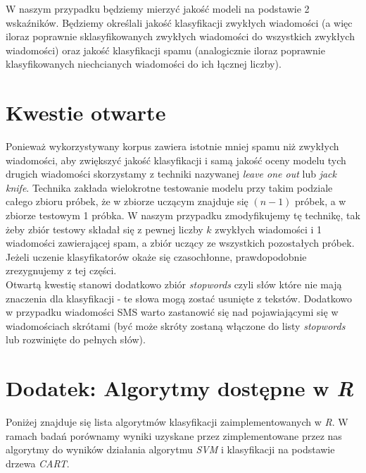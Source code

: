 \documentclass[a4paper,12pt]{article}
\begin{document}
W naszym przypadku będziemy mierzyć jakość modeli na podstawie 2 wskaźników. Będziemy określali jakość klasyfikacji zwykłych wiadomości (a więc iloraz poprawnie sklasyfikowanych zwykłych wiadomości do wszystkich zwykłych wiadomości) oraz jakość klasyfikacji spamu (analogicznie iloraz poprawnie klasyfikowanych niechcianych wiadomości do ich łącznej liczby).\\

\section{Kwestie otwarte}

Ponieważ wykorzystywany korpus zawiera istotnie mniej spamu niż zwykłych wiadomości, aby zwiększyć jakość klasyfikacji i samą jakość oceny modelu tych drugich wiadomości skorzystamy z techniki nazywanej \textit{leave one out} lub \textit{jack knife}. Technika zakłada wielokrotne testowanie modelu przy takim podziale całego
zbioru próbek, że w zbiorze uczącym znajduje się $(n-1)$ próbek, a w zbiorze testowym 1 próbka. W naszym przypadku zmodyfikujemy tę technikę, tak żeby zbiór testowy składał się z pewnej liczby $k$ zwykłych wiadomości i 1 wiadomości zawierającej spam, a zbiór uczący ze wszystkich pozostałych próbek. Jeżeli uczenie klasyfikatorów okaże się czasochłonne, prawdopodobnie zrezygnujemy z tej części.\\

Otwartą kwestię stanowi dodatkowo zbiór \textit{stopwords} czyli słów które nie mają znaczenia dla klasyfikacji - te słowa mogą zostać usunięte z tekstów. Dodatkowo w przypadku wiadomości SMS warto zastanowić się nad pojawiającymi się w wiadomościach skrótami (być może skróty zostaną włączone do listy \textit{stopwords} lub rozwinięte do pełnych słów).

\section{Dodatek: Algorytmy dostępne w \textit{R}} 

Poniżej znajduje się lista algorytmów klasyfikacji zaimplementowanych w \textit{R}. W ramach badań porównamy wyniki uzyskane przez zimplementowane
przez nas algorytmy do wyników działania algorytmu \textit{SVM} i klasyfikacji na podstawie drzewa \textit{CART}.
\end{document}

